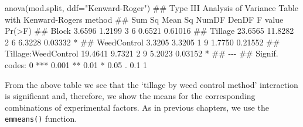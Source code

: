 \documentclass[a4paper,12pt,oneside]{book}
\newenvironment{Shaded}{\begin{snugshade}}{\end{snugshade}}
\newcommand{\StringTok}[1]{#1}
\newcommand{\DocumentationTok}[1]{#1}
\newcommand{\FunctionTok}[1]{#1}
\newcommand{\AttributeTok}[1]{#1}
\newcommand{\NormalTok}[1]{#1}
\begin{document}
\begin{Shaded}
\begin{Highlighting}[]
\FunctionTok{anova}\NormalTok{(mod.split, }\AttributeTok{ddf=}\StringTok{"Kenward{-}Roger"}\NormalTok{)}
\DocumentationTok{\#\# Type III Analysis of Variance Table with Kenward{-}Roger\textquotesingle{}s method}
\DocumentationTok{\#\#                      Sum Sq Mean Sq NumDF DenDF F value  Pr(\textgreater{}F)  }
\DocumentationTok{\#\# Block                3.6596  1.2199     3     6  0.6521 0.61016  }
\DocumentationTok{\#\# Tillage             23.6565 11.8282     2     6  6.3228 0.03332 *}
\DocumentationTok{\#\# WeedControl          3.3205  3.3205     1     9  1.7750 0.21552  }
\DocumentationTok{\#\# Tillage:WeedControl 19.4641  9.7321     2     9  5.2023 0.03152 *}
\DocumentationTok{\#\# {-}{-}{-}}
\DocumentationTok{\#\# Signif. codes:  0 \textquotesingle{}***\textquotesingle{} 0.001 \textquotesingle{}**\textquotesingle{} 0.01 \textquotesingle{}*\textquotesingle{} 0.05 \textquotesingle{}.\textquotesingle{} 0.1 \textquotesingle{} \textquotesingle{} 1}
\end{Highlighting}
\end{Shaded}

From the above table we see that the `tillage by weed control method' interaction is significant and, therefore, we show the means for the corresponding combinations of experimental factors. As in previous chapters, we use the \texttt{emmeans()} function.
\end{document}
